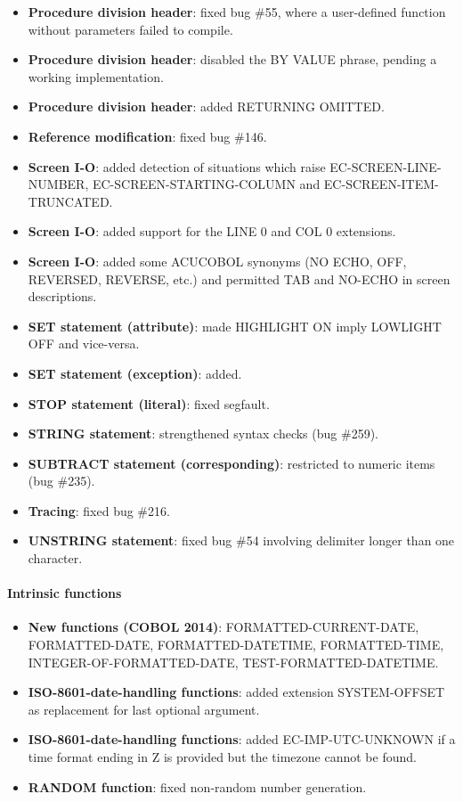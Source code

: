 \begin{itemize}
\item \textbf{Procedure division header}: fixed bug \#55, where a user-defined function without parameters failed to compile.
\item \textbf{Procedure division header}: disabled the BY VALUE phrase, pending a working implementation.
\item \textbf{Procedure division header}: added RETURNING OMITTED.
\item \textbf{Reference modification}: fixed bug \#146.
\item \textbf{Screen I-O}: added detection of situations which raise EC-SCREEN-LINE-NUMBER, EC-SCREEN-STARTING-COLUMN and EC-SCREEN-ITEM-TRUNCATED.
\item \textbf{Screen I-O}: added support for the LINE 0 and COL 0 extensions.
\item \textbf{Screen I-O}: added some ACUCOBOL synonyms (NO ECHO, OFF, REVERSED, REVERSE, etc.) and permitted TAB and NO-ECHO in screen descriptions.
\item \textbf{SET statement (attribute)}: made HIGHLIGHT ON imply LOWLIGHT OFF and vice-versa.
\item \textbf{SET statement (exception)}: added.
\item \textbf{STOP statement (literal)}: fixed segfault.
\item \textbf{STRING statement}: strengthened syntax checks (bug \#259).
\item \textbf{SUBTRACT statement (corresponding)}: restricted to numeric items (bug \#235).
\item \textbf{Tracing}: fixed bug \#216.
\item \textbf{UNSTRING statement}: fixed bug \#54 involving delimiter longer than one character.
\end{itemize}

\paragraph{Intrinsic functions}
\begin{itemize}
\item \textbf{New functions (COBOL 2014)}: FORMATTED-CURRENT-DATE, FORMATTED-DATE, FORMATTED-DATETIME, FORMATTED-TIME, INTEGER-OF-FORMATTED-DATE, TEST-FORMATTED-DATETIME.
\item \textbf{ISO-8601-date-handling functions}: added extension SYSTEM-OFFSET as replacement for last optional argument.
\item \textbf{ISO-8601-date-handling functions}: added EC-IMP-UTC-UNKNOWN if a time format ending in Z is provided but the timezone cannot be found.
\item \textbf{RANDOM function}: fixed non-random number generation.
\end{itemize}


